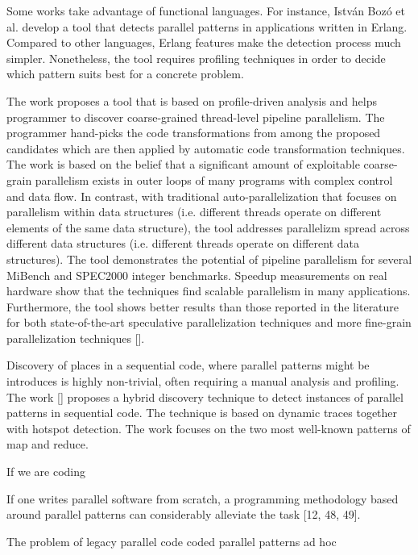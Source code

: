 Some works take advantage of functional languages. For instance, István Bozó et al. \cite{10.1145/2633448.2633453} develop a tool that detects parallel patterns in applications written in Erlang. Compared to other languages, Erlang
features make the detection process much simpler. Nonetheless, the tool requires profiling techniques in order to decide which pattern suits best for a concrete problem.



The work \cite{10.1016/j.parco.2010.05.006} proposes
a tool that is based on profile-driven analysis and helps programmer to discover coarse-grained thread-level pipeline parallelism. The programmer hand-picks the code transformations from among the proposed candidates which are then applied by automatic code transformation techniques. The work is based on the belief that a significant amount of exploitable coarse-grain parallelism exists in outer loops of many programs with complex control and data flow. In contrast, with traditional auto-parallelization that focuses on parallelism within data structures (i.e. different threads operate on different elements of the same data structure), the tool addresses parallelizm spread across different data structures (i.e. different threads operate on different data structures).
The tool demonstrates the potential of pipeline parallelism for several MiBench and SPEC2000 integer benchmarks. Speedup
measurements on real hardware show that the techniques find scalable parallelism in many applications. Furthermore, the tool shows better results than those reported in the literature for both state-of-the-art speculative parallelization techniques \cite{10.1109/ISCA.2006.13} and more fine-grain parallelization techniques [].


Discovery of places in a sequential code, where parallel patterns might be introduces is highly non-trivial, often requiring a manual analysis and profiling. The work [] proposes a hybrid discovery technique to detect instances of parallel patterns in sequential code. The technique is based on dynamic traces together with hotspot detection. The work focuses on the two most well-known patterns of map and reduce.

\quad If we are coding 

\quad If one writes parallel software from scratch, a programming methodology based around parallel patterns can considerably alleviate the task [12, 48, 49].



The problem of legacy parallel code
coded parallel patterns ad hoc

